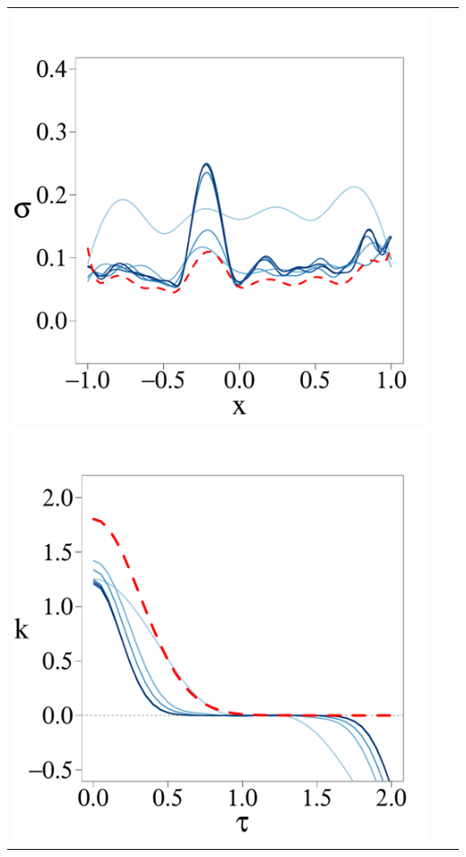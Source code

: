 \documentclass[8pt]{beamer} %
\begin{document}
\begin{frame}
\begin{itemize}
\begin{adjustwidth}{-4.3em}{-3em}
\begin{tabular}{ c c c }
\includegraphics[scale=0.17, trim = 0mm 14mm 0mm 14mm, clip]{ch5_fig3_Sigma_part2.pdf} 
\includegraphics[scale=0.17, trim = 0mm 14mm 5mm 14mm, clip]{ch5_fig3_Cov_part2.pdf} &\\

\end{tabular}
\end{adjustwidth}
\end{itemize}
\end{frame}
\end{document}
